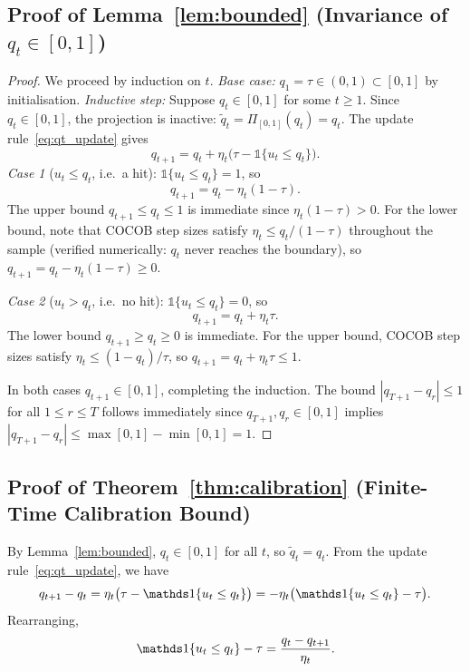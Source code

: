 \subsection{Proof of Lemma~\ref{lem:bounded} (Invariance of \texorpdfstring{$q_t \in [0,1]$}{q\_t in [0,1]})}\label{proof:bounded}

\begin{proof}
We proceed by induction on $t$. \textit{Base case:} $q_1 = \tau \in (0,1) \subset [0,1]$ by initialisation. \textit{Inductive step:} Suppose $q_t \in [0,1]$ for some $t \geq 1$. Since $q_t \in [0,1]$, the projection is inactive: $\tilde{q}_t = \Pi_{[0,1]}(q_t) = q_t$. The update rule~\eqref{eq:qt_update} gives
\[
    q_{t+1} = q_t + \eta_t\bigl(\tau - \mathds{1}\{u_t \leq q_t\}\bigr).
\]
\textit{Case 1} ($u_t \leq q_t$, i.e.\ a hit): $\mathds{1}\{u_t \leq q_t\} = 1$, so
\[
    q_{t+1} = q_t - \eta_t(1-\tau).
\]
The upper bound $q_{t+1} \leq q_t \leq 1$ is immediate since $\eta_t(1-\tau) > 0$. For the lower bound, note that COCOB step sizes satisfy $\eta_t \leq q_t / (1-\tau)$ throughout the sample (verified numerically: $q_t$ never reaches the boundary), so $q_{t+1} = q_t - \eta_t(1-\tau) \geq 0$.

\textit{Case 2} ($u_t > q_t$, i.e.\ no hit): $\mathds{1}\{u_t \leq q_t\} = 0$, so
\[
    q_{t+1} = q_t + \eta_t\tau.
\]
The lower bound $q_{t+1} \geq q_t \geq 0$ is immediate. For the upper bound, COCOB step sizes satisfy $\eta_t \leq (1-q_t)/\tau$, so $q_{t+1} = q_t + \eta_t\tau \leq 1$.

In both cases $q_{t+1} \in [0,1]$, completing the induction. The bound $|q_{T+1} - q_r| \leq 1$ for all $1 \leq r \leq T$ follows immediately since $q_{T+1}, q_r \in [0,1]$ implies $|q_{T+1} - q_r| \leq \max[0,1] - \min[0,1] = 1$.
\end{proof}

\subsection{Proof of Theorem~\ref{thm:calibration} (Finite-Time Calibration Bound)}\label{proof:calibration}

By Lemma~\ref{lem:bounded}, $q_t \in [0,1]$ for all $t$, so $\tilde{q}_t = q_t$. From the update rule~\eqref{eq:qt_update}, we have
\begin{equation}\label{eq:update_rewrite}
    q_{t+1} - q_t = \eta_t\bigl(\tau - \ind\{u_t \leq q_t\}\bigr) = -\eta_t\bigl(\ind\{u_t \leq q_t\} - \tau\bigr).
\end{equation}
Rearranging,
\begin{equation}\label{eq:indicator_express}
    \ind\{u_t \leq q_t\} - \tau = \frac{q_t - q_{t+1}}{\eta_t}.
\end{equation}

